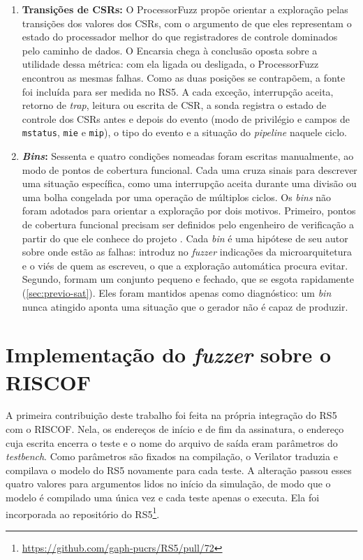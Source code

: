 \begin{enumerate}
    \item \textbf{Transições de CSRs:} O ProcessorFuzz \citep{Canakci:2023:ProcessorFuzz} propõe orientar a exploração pelas transições dos valores dos CSRs, com o argumento de que eles representam o estado do processador melhor do que registradores de controle dominados pelo caminho de dados. O Encarsia chega à conclusão oposta sobre a utilidade dessa métrica: com ela ligada ou desligada, o ProcessorFuzz encontrou as mesmas falhas. Como as duas posições se contrapõem, a fonte foi incluída para ser medida no RS5. A cada exceção, interrupção aceita, retorno de \textit{trap}, leitura ou escrita de CSR, a sonda registra o estado de controle dos CSRs antes e depois do evento (modo de privilégio e campos de \texttt{mstatus}, \texttt{mie} e \texttt{mip}), o tipo do evento e a situação do \textit{pipeline} naquele ciclo.

    \item \textbf{\textit{Bins}:} Sessenta e quatro condições nomeadas foram escritas manualmente, ao modo de pontos de cobertura funcional. Cada uma cruza sinais para descrever uma situação específica, como uma interrupção aceita durante uma divisão ou uma bolha congelada por uma operação de múltiplos ciclos. Os \textit{bins} não foram adotados para orientar a exploração por dois motivos. Primeiro, pontos de cobertura funcional precisam ser definidos pelo engenheiro de verificação a partir do que ele conhece do projeto \citep{Laeufer:2018:RFUZZ}. Cada \textit{bin} é uma hipótese de seu autor sobre onde estão as falhas: introduz no \textit{fuzzer} indicações da microarquitetura e o viés de quem as escreveu, o que a exploração automática procura evitar. Segundo, formam um conjunto pequeno e fechado, que se esgota rapidamente (\cref{sec:previo-sat}). Eles foram mantidos apenas como diagnóstico: um \textit{bin} nunca atingido aponta uma situação que o gerador não é capaz de produzir.
\end{enumerate}

\section{Implementação do \textit{fuzzer} sobre o RISCOF}\label{sec:previo-impl}

A primeira contribuição deste trabalho foi feita na própria integração do RS5 com o RISCOF. Nela, os endereços de início e de fim da assinatura, o endereço cuja escrita encerra o teste e o nome do arquivo de saída eram parâmetros do \textit{testbench}. Como parâmetros são fixados na compilação, o Verilator traduzia e compilava o modelo do RS5 novamente para cada teste. A alteração passou esses quatro valores para argumentos lidos no início da simulação, de modo que o modelo é compilado uma única vez e cada teste apenas o executa. Ela foi incorporada ao repositório do RS5\footnote{\url{https://github.com/gaph-pucrs/RS5/pull/72}}.

